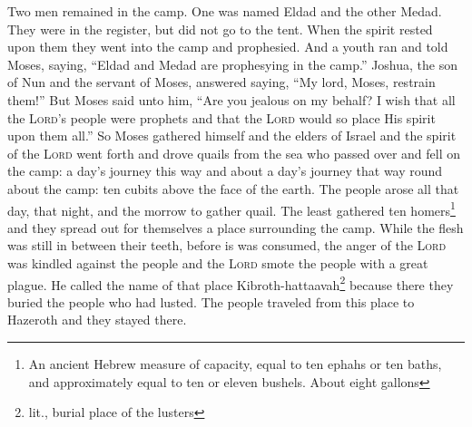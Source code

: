 \begin{inparaenum}
     Two men remained in the camp. One was named Eldad and the other Medad. They were in the register, but did not go to the tent. When the spirit rested upon them they went into the camp and prophesied.%
     And a youth ran and told Moses, saying, ``Eldad and Medad are prophesying in the camp.''%
     Joshua, the son of Nun and the servant of Moses, answered saying, ``My lord, Moses, restrain them!''%
     But Moses said unto him, ``Are you jealous on my behalf? I wish that all the \textsc{Lord}'s people were prophets and that the \textsc{Lord} would so place His spirit upon them all.''%
     So Moses gathered himself and the elders of Israel%
     and the spirit of the \textsc{Lord} went forth and drove quails from the sea who passed over and fell on the camp: a day's journey this way and about a day's journey that way round about the camp: ten cubits above the face of the earth.%
     The people arose all that day, that night, and the morrow to gather quail. The least gathered ten homers\footnote{An ancient Hebrew measure of capacity, equal to ten ephahs or ten baths, and approximately equal to ten or eleven bushels. About eight gallons} and they spread out for themselves a place surrounding the camp.%
     While the flesh was still in between their teeth, before is was consumed, the anger of the \textsc{Lord} was kindled against the people and the \textsc{Lord} smote the people with a great plague.%
     He called the name of that place Kibroth-hattaavah\footnote{lit., burial place of the lusters} because there they buried the people who had lusted.%
     The people traveled from this place to Hazeroth and they stayed there.%
\end{inparaenum}

